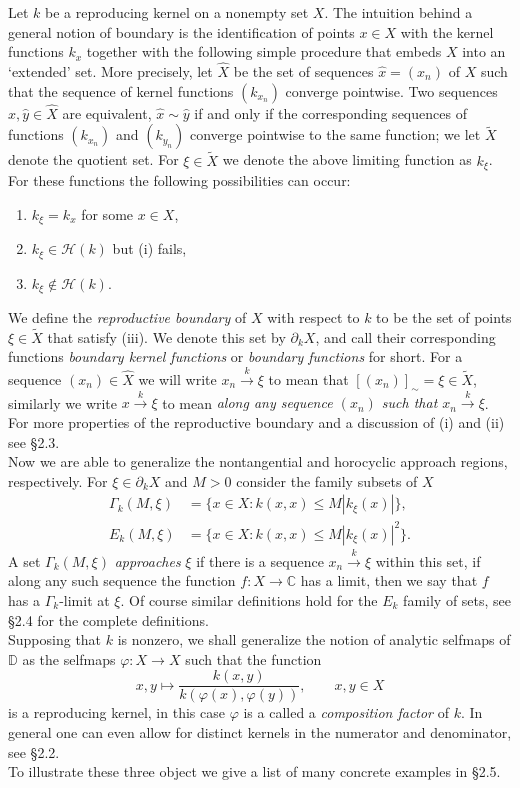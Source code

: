 \documentclass[leqno, final]{article}
\theoremstyle{definition}
\newcommand{\xto}[1]{\stackrel{#1}{\to}}
\newcommand{\disk}{\mathbb{D}}
\newcommand{\plane}{\mathbb{C}}
\newcommand{\Hilbert}{\mathcal{H}}
\renewcommand{\phi}{\varphi}
\begin{document}
Let $k$ be a reproducing kernel on a nonempty set $X$.
The intuition behind a general notion of boundary is the identification of points
$x\in X$ with the kernel functions $k_x$ together with the following simple
procedure that embeds $X$ into an `extended' set. More precisely, let $\widehat X$
be the set of sequences $\hat x = (x_n)$ of $X$ such that the sequence of kernel functions $(k_{x_n})$
converge pointwise. Two sequences $\hat x,\hat y\in\widehat X$ are equivalent,
$\hat x\sim\hat y$ if and only if the corresponding sequences of functions $(k_{x_n})$ and
$(k_{y_n})$ converge pointwise to the same function; we let $\widetilde X$ denote the
quotient set. For $\xi\in\widetilde X$ we denote the above limiting function as $k_\xi$.
For these functions the following possibilities can occur:
\begin{enumerate}[label=(\roman*)]
\item $k_\xi = k_x$ for some $x\in X$,
\item $k_\xi\in\Hilbert(k)$ but (i) fails,
\item $k_\xi\notin\Hilbert(k)$.
\end{enumerate}
We define the \emph{reproductive boundary} of $X$ with respect to $k$ to be the
set of points $\xi\in\widetilde X$ that satisfy (iii). We denote this set by $\partial_kX$,
and call their corresponding functions \emph{boundary kernel functions} or
\emph{boundary functions} for short. For a sequence $(x_n)\in \widehat X$
we will write $x_n\xto{k}\xi$ to mean that $[(x_n)]_\sim=\xi\in\widetilde X$, similarly
we write $x\xto{k}\xi$ to mean \emph{along any sequence $(x_n)$ such that $x_n\xto{k}\xi$}.
For more properties of the reproductive boundary and a discussion of (i) and (ii) see \S2.3.
\\ Now we are able to generalize the nontangential and horocyclic approach regions, respectively.
For $\xi\in\partial_kX$ and $M>0$ consider the family subsets of $X$ \begin{align}
	\Gamma_k(M,\xi) &= \{x\in X: k(x,x)\leq M|k_\xi(x)|\}, \\
	E_k(M,\xi) &= \{x\in X: k(x,x)\leq M|k_\xi(x)|^2\}.
\end{align}
A set $\Gamma_k(M,\xi)$ \emph{approaches} $\xi$ if there is a sequence $x_n\xto{k}\xi$
within this set, if along any such sequence the function $f:X\to\plane$ has a limit, then
we say that $f$ has a $\Gamma_k$-limit at $\xi$. Of course similar definitions hold for
the $E_k$ family of sets, see \S2.4 for the complete definitions.
\\ Supposing that $k$ is nonzero, we shall generalize the notion of
analytic selfmaps of $\disk$ as the selfmaps $\phi:X\to X$ such that the function
\begin{equation}\label{eq:composition-factor}
	x,y\mapsto \frac{k(x,y)}{k(\phi(x),\phi(y))}, \qquad x,y\in X
\end{equation}
is a reproducing kernel, in this case $\phi$ is a called a \emph{composition factor} of $k$.
In general one can even allow for distinct kernels in the numerator and denominator,
see \S2.2.
\\ To illustrate these three object we give a list of many concrete examples in \S2.5.
\end{document}
